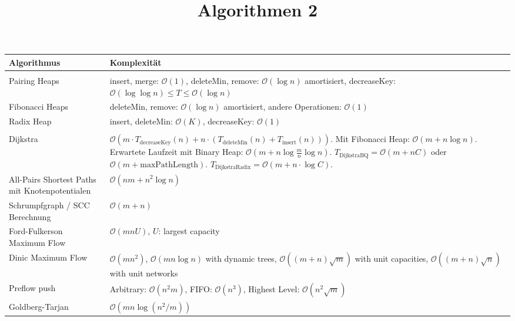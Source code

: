 \documentclass[11pt]{scrartcl}
\title{Algorithmen 2}
\date{\vspace{-5ex}}
\begin{document}
\maketitle

\begin{xltabular}{\linewidth}{p{60mm}p{80mm}}
    Algorithmus &
    Komplexität \\
    \hline
    \vspace{-1em} & \\ 
    \hline
    Pairing Heaps &
    insert, merge: $\mathcal{O}(1)$, deleteMin, remove: $\mathcal{O}(\log n)$ amortisiert,
    decreaseKey: $\mathcal{O}(\log \log n) \leq T \leq \mathcal{O}(\log n)$ \\
    \hline
    Fibonacci Heaps &
    deleteMin, remove: $\mathcal{O}(\log n)$ amortisiert, andere Operationen: $\mathcal{O}(1)$ \\
    \hline
    Radix Heap &
    insert, deleteMin: $\mathcal{O}(K)$, decreaseKey: $\mathcal{O}(1)$ \\
    \hline
    \vspace{-1em} & \\ 
    \hline
    Dijkstra &
    $\mathcal{O}(m \cdot T_\mathrm{decreaseKey}(n) + n \cdot (T_\mathrm{deleteMin}(n) + 
    T_\mathrm{insert}(n)))$. Mit Fibonacci Heap: $\mathcal{O}(m + n \log n)$. Erwartete 
    Laufzeit mit Binary Heap: $\mathcal{O}(m + n \log \frac{m}{n} \log n)$. 
    $T_\mathrm{DijkstraBQ} = \mathcal{O}(m + nC)$ oder $\mathcal{O}(m + 
    \mathrm{maxPathLength})$. $T_\mathrm{DijkstraRadix} = \mathcal{O}(m + n \cdot \log C)$.\\
    \hline
    All-Pairs Shortest Paths mit Knotenpotentialen &
    $\mathcal{O}(nm + n^2 \log n)$ \\
    \hline
    Schrumpfgraph / SCC Berechnung &
    $\mathcal{O}(m + n)$ \\
    \hline
    Ford-Fulkerson Maximum Flow &
    $\mathcal{O}(mnU)$, $ U$: largest capacity \\
    \hline
    Dinic Maximum Flow &
    $\mathcal{O}(mn^2)$, $\mathcal{O}(mn \log n)$ with dynamic trees, $\mathcal{O}((m + n) 
    \sqrt{m})$ with unit capacities, $\mathcal{O}((m + n)\sqrt{n})$ with unit networks \\
    \hline
    Preflow push &
    Arbitrary: $\mathcal{O}(n^2 m)$, FIFO: $\mathcal{O}(n^3)$, Highest Level: 
    $\mathcal{O}(n^2 \sqrt{m})$\\
    \hline
    Goldberg-Tarjan &
    $\mathcal{O}(mn \log (n^2 / m))$ \\

\end{xltabular}
\end{document}
